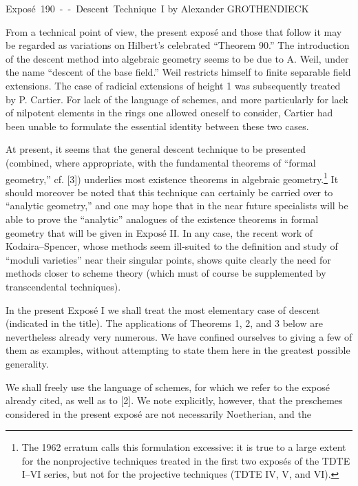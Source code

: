 \unit{Exposé 190 -- Descent Technique I}
%
  {by Alexander GROTHENDIECK}

From a technical point of view, the present exposé and those that follow it may
be regarded as variations on Hilbert's celebrated “Theorem 90.” The
introduction of the descent method into algebraic geometry seems to be due to
A. Weil, under the name “descent of the base field.” Weil restricts himself to
finite separable field extensions. The case of radicial extensions of height 1
was subsequently treated by P. Cartier. For lack of the language of schemes,
and more particularly for lack of nilpotent elements in the rings one allowed
oneself to consider, Cartier had been unable to formulate the essential
identity between these two cases.

At present, it seems that the general descent technique to be presented
(combined, where appropriate, with the fundamental theorems of “formal
geometry,” cf. [3]) underlies most existence theorems in algebraic
geometry.\footnote{The 1962 erratum calls this formulation excessive: it is
true to a large extent for the nonprojective techniques treated in the first
two exposés of the TDTE I--VI series, but not for the projective techniques
(TDTE IV, V, and VI).} It should moreover be noted that this technique can
certainly be carried over to “analytic geometry,” and one may hope that in the
near future specialists will be able to prove the “analytic” analogues of the
existence theorems in formal geometry that will be given in Exposé II. In any
case, the recent work of Kodaira--Spencer, whose methods seem ill-suited to the
definition and study of “moduli varieties” near their singular points, shows
quite clearly the need for methods closer to scheme theory (which must of
course be supplemented by transcendental techniques).

In the present Exposé I we shall treat the most elementary case of descent
(indicated in the title). The applications of Theorems 1, 2, and 3 below are
nevertheless already very numerous. We have confined ourselves to giving a few
of them as examples, without attempting to state them here in the greatest
possible generality.

We shall freely use the language of schemes, for which we refer to the exposé
already cited, as well as to [2]. We note explicitly, however, that the
preschemes considered in the present exposé are not necessarily Noetherian, and
the

